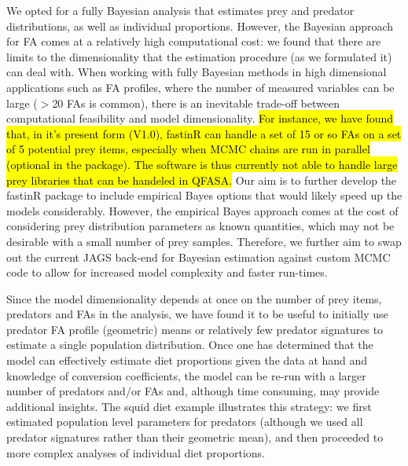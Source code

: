 \documentclass[fleqn,10pt]{wlpeerj}
\begin{document}
We opted for a fully Bayesian analysis that estimates prey and predator
distributions, as well as individual proportions. However, the Bayesian
approach for FA comes at a relatively
high computational cost: we found that there are limits to the dimensionality
that the estimation procedure (as we formulated it) can deal with. When working with
fully Bayesian methods in high dimensional applications such as FA profiles,
where the number of measured variables can be large ($>$20 FAs is common), there
is an inevitable trade-off between computational feasibility and
model dimensionality. \hl{For instance, we have found that, in it's present form (V1.0), fastinR can handle a set of 15 or so FAs on a set of 5 potential prey items, especially when MCMC chains are run in parallel (optional in the package). The software is thus currently not able to handle large prey libraries that can be handeled in QFASA.} Our aim is to further
develop the fastinR package to include empirical Bayes options \citep[as
described in][]{parnell_bayesian_2012} that would likely speed up
the models considerably. However, the empirical Bayes approach comes at the cost of considering prey
distribution parameters as known quantities, which may not be desirable with a
small number of prey samples. Therefore, we further aim to swap out the current JAGS back-end for Bayesian estimation against custom MCMC code to allow for increased model complexity and faster run-times.

Since the model dimensionality depends at once on the number of prey items, predators and
FAs in the analysis, we have found it to be useful to
initially use
predator FA profile (geometric) means or relatively few predator signatures to
estimate a single population distribution. Once one has determined
that the model can effectively estimate diet proportions given the
data at hand and knowledge of conversion coefficients, the model can
be re-run with a larger number of predators and/or FAs and, although time consuming, may provide additional
insights. The squid diet example illustrates this strategy: we first
estimated population level parameters for predators (although we used
all predator signatures rather than their geometric mean), and then
proceeded to more complex analyses of individual diet proportions.
\end{document}
